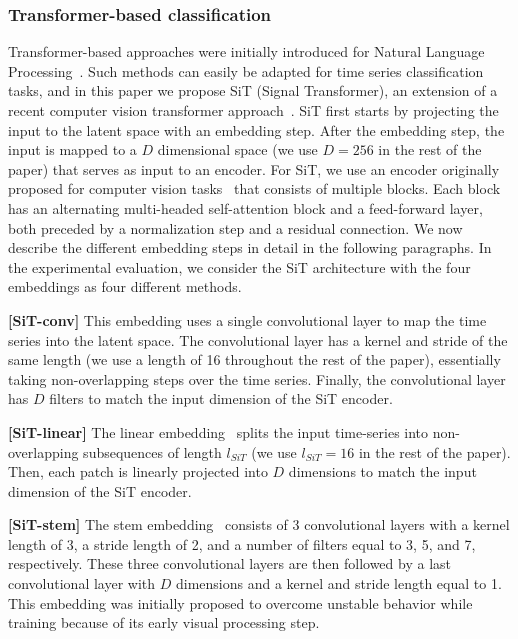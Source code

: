 \subsubsection{Transformer-based classification}

Transformer-based approaches were initially introduced for Natural Language Processing~\cite{vaswani2017attention}. Such methods can easily be adapted for time series classification tasks, and in this paper we propose SiT (Signal Transformer), an extension of a recent computer vision transformer approach~\cite{dosovitskiy2020image}. SiT first starts by projecting the input to the latent space with an embedding step. After the embedding step, the input is mapped to a $D$ dimensional space (we use $D=256$ in the rest of the paper) that serves as input to an encoder. For SiT, we use an encoder originally proposed for computer vision tasks~\cite{vaswani2017attention} that consists of multiple blocks. Each block has an alternating multi-headed self-attention block and a feed-forward layer, both preceded by a normalization step and a residual connection. We now describe the different embedding steps in detail in the following paragraphs. In the experimental evaluation, we consider the SiT architecture with the four embeddings as four different methods.

\noindent\textbf{[SiT-conv]}
This embedding uses a single convolutional layer to map the time series into the latent space. The convolutional layer has a kernel and stride of the same length (we use a length of 16 throughout the rest of the paper), essentially taking non-overlapping steps over the time series. Finally, the convolutional layer has $D$ filters to match the input dimension of the SiT encoder.

\noindent\textbf{[SiT-linear]}
The linear embedding~\cite{dosovitskiy2020image} splits the input time-series into non-overlapping subsequences of length $l_{SiT}$ (we use $l_{SiT}=16$ in the rest of the paper). Then, each patch is linearly projected into $D$ dimensions to match the input dimension of the SiT encoder.

\noindent\textbf{[SiT-stem]}
The stem embedding~\cite{xiao2021early} consists of 3 convolutional layers with a kernel length of 3, a stride length of 2, and a number of filters equal to 3, 5, and 7, respectively. These three convolutional layers are then followed by a last convolutional layer with $D$ dimensions and a kernel and stride length equal to 1. This embedding was initially proposed to overcome unstable behavior while training because of its early visual processing step. 

